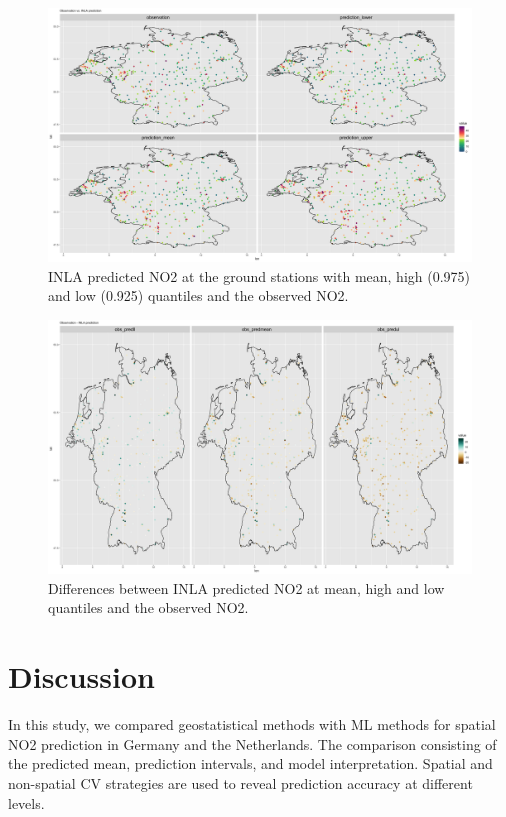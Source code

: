 \documentclass{article}
\begin{document}
\begin{figure}
\centering
\includegraphics[scale = 0.05]{fig/pred_11var.png}
\caption{INLA predicted NO2 at the ground stations with mean, high (0.975) and low (0.925) quantiles and the observed NO2.}
\label{INLApred}
\end{figure}

\begin{figure}
\centering
\includegraphics[scale = 0.05]{fig/dif_obs_INLA_11var.png}
\caption{Differences between INLA predicted NO2 at mean, high and low quantiles and the observed NO2. }
\label{difINLA}
\end{figure}

\section{Discussion}
In this study, we compared geostatistical methods with ML methods for spatial NO2 prediction in Germany and the Netherlands. The comparison consisting of the predicted mean, prediction intervals, and model interpretation. Spatial and non-spatial CV strategies are used to reveal prediction accuracy at different levels. %
\end{document}
